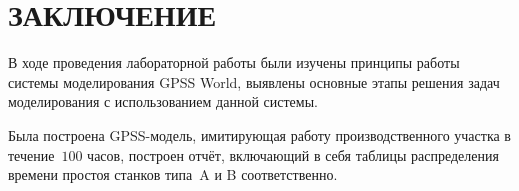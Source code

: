 \section*{ЗАКЛЮЧЕНИЕ}

В ходе проведения лабораторной работы были изучены принципы работы
системы моделирования GPSS World, выявлены основные этапы
решения задач моделирования с использованием данной системы.

Была построена GPSS-модель, имитирующая работу производственного участка
в течение~$100$ часов, построен отчёт, включающий в себя таблицы распределения
времени простоя станков типа~A и B соответственно.

\newpage

